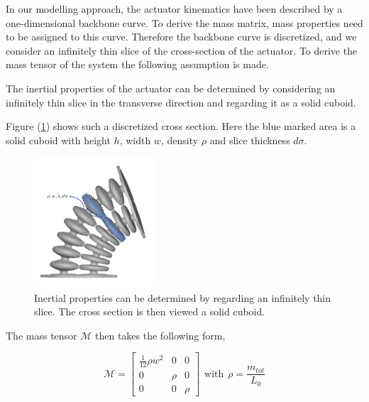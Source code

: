 In our modelling approach, the actuator kinematics have been described by a one-dimensional backbone curve. To derive the mass matrix, mass properties need to be assigned to this curve. Therefore the backbone curve is discretized, and we consider an infinitely thin slice of the cross-section of the actuator. To derive the mass tensor of the system the following assumption is made.

\begin{theorem}
The inertial properties of the actuator can be determined by considering an infinitely thin slice in the transverse direction and regarding it as a solid cuboid.
\end{theorem}

Figure (\ref{fig:massapprox}) shows such a discretized cross section. Here the blue marked area is a solid cuboid with height $h$, width $w$, density $\rho$ and slice thickness $d\sigma$. 


\begin{figure}[H]
    \centering
    \includegraphics[width = 0.4\textwidth]{Figures/Chapter2/massapprox.png}
    \caption{Inertial properties can be determined by regarding an infinitely thin slice. The cross section is then viewed a solid cuboid.}
    \label{fig:massapprox}
\end{figure}


The mass tensor $\mathcal{M}$ then takes the following form,

\begin{equation}
    \mathcal{M} = \begin{bmatrix} \frac{1}{12}\rho w^2 & 0 & 0 \\
                                   0 & \rho & 0 \\
                                   0 & 0 & \rho \end{bmatrix}\hspace{5pt} \text{with} \hspace{5pt} \rho = \frac{m_{tot}}{L_0}
\end{equation} 




